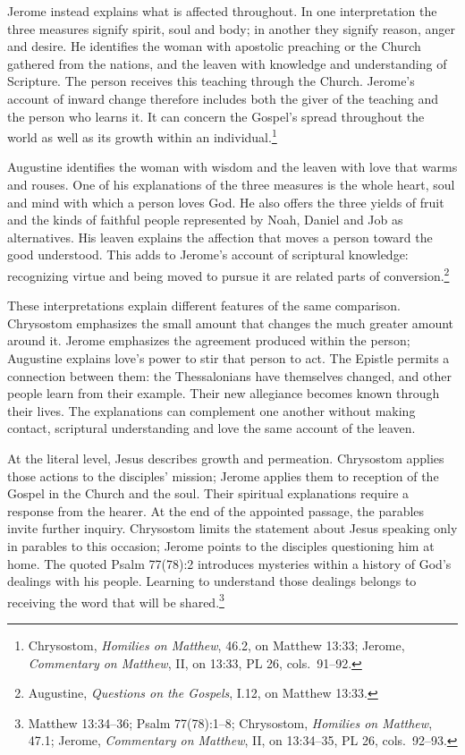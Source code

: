 Jerome instead explains what is affected throughout. In one interpretation the three measures signify spirit, soul and body; in another they signify reason, anger and desire. He identifies the woman with apostolic preaching or the Church gathered from the nations, and the leaven with knowledge and understanding of Scripture. The person receives this teaching through the Church. Jerome's account of inward change therefore includes both the giver of the teaching and the person who learns it. It can concern the Gospel's spread throughout the world as well as its growth within an individual.\footnote{Chrysostom, \textit{Homilies on Matthew}, 46.2, on Matthew 13:33; Jerome, \textit{Commentary on Matthew}, II, on 13:33, PL 26, cols.~91--92.}

Augustine identifies the woman with wisdom and the leaven with love that warms and rouses. One of his explanations of the three measures is the whole heart, soul and mind with which a person loves God. He also offers the three yields of fruit and the kinds of faithful people represented by Noah, Daniel and Job as alternatives. His leaven explains the affection that moves a person toward the good understood. This adds to Jerome's account of scriptural knowledge: recognizing virtue and being moved to pursue it are related parts of conversion.\footnote{Augustine, \textit{Questions on the Gospels}, I.12, on Matthew 13:33.}

These interpretations explain different features of the same comparison. Chrysostom emphasizes the small amount that changes the much greater amount around it. Jerome emphasizes the agreement produced within the person; Augustine explains love's power to stir that person to act. The Epistle permits a connection between them: the Thessalonians have themselves changed, and other people learn from their example. Their new allegiance becomes known through their lives. The explanations can complement one another without making contact, scriptural understanding and love the same account of the leaven.

At the literal level, Jesus describes growth and permeation. Chrysostom applies those actions to the disciples' mission; Jerome applies them to reception of the Gospel in the Church and the soul. Their spiritual explanations require a response from the hearer. At the end of the appointed passage, the parables invite further inquiry. Chrysostom limits the statement about Jesus speaking only in parables to this occasion; Jerome points to the disciples questioning him at home. The quoted Psalm 77(78):2 introduces mysteries within a history of God's dealings with his people. Learning to understand those dealings belongs to receiving the word that will be shared.\footnote{Matthew 13:34--36; Psalm 77(78):1--8; Chrysostom, \textit{Homilies on Matthew}, 47.1; Jerome, \textit{Commentary on Matthew}, II, on 13:34--35, PL 26, cols.~92--93.}

